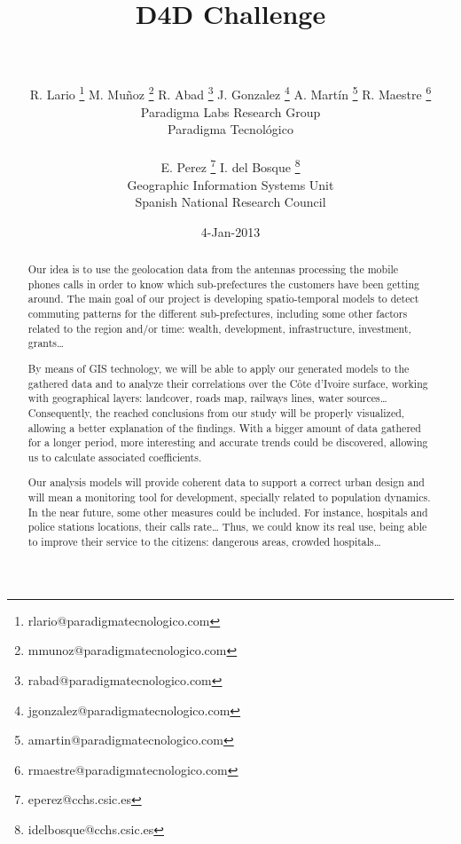 \documentclass[a4paper,11pt]{article}
\begin{document}
\title{{\huge D4D Challenge} \\  \\ }

\author{{
				R. Lario  \footnote{rlario@paradigmatecnologico.com} 
				M. Muñoz  \footnote{mmunoz@paradigmatecnologico.com} 
				R. Abad  \footnote{rabad@paradigmatecnologico.com} 
				J. Gonzalez  \footnote{jgonzalez@paradigmatecnologico.com} 
				A. Martín  \footnote{amartin@paradigmatecnologico.com} 
				R. Maestre  \footnote{rmaestre@paradigmatecnologico.com} 
				\\\small Paradigma Labs Research Group \\\small Paradigma Tecnológico\\ \\
				E. Perez  \footnote{eperez@cchs.csic.es} 
				I. del Bosque  \footnote{idelbosque@cchs.csic.es} 
				\\\small Geographic Information Systems Unit \\\small Spanish National Research Council
				}}

\date{4-Jan-2013}
\maketitle

\begin{abstract} 
Our idea is to use the geolocation data from the antennas processing the mobile phones calls in order to know which sub-prefectures the customers have been getting around. The main goal of our project is developing spatio-temporal models to detect commuting patterns for the different sub-prefectures, including some other factors related to the region and/or time: wealth, development, infrastructure, investment, grants…

By means of GIS technology, we will be able to apply our generated models to the gathered data and to analyze their correlations over the Côte d’Ivoire surface, working with geographical layers: landcover, roads map, railways lines, water sources… Consequently, the reached conclusions from our study will be properly visualized, allowing a better explanation of the findings. With a bigger amount of data gathered for a longer period, more interesting and accurate trends could be discovered, allowing us to calculate associated coefficients.

Our analysis models will provide coherent data to support a correct urban design and will mean a monitoring tool for development, specially related to population dynamics.
In the near future, some other measures could be included. For instance, hospitals and police stations locations, their calls rate… Thus, we could know its real use, being able to improve their service to the citizens: dangerous areas, crowded hospitals…
\end{abstract}
\end{document}
